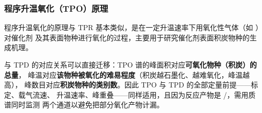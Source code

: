 \subsubsection{程序升温氧化（TPO）原理}

程序升温氧化的原理与 TPR 基本类似，是在一定升温速率下用氧化性气体（如 ）对催化剂
及其表面物种进行氧化的过程，主要用于研究催化剂表面积炭物种的生成机理。

\begin{principle}
与 TPD 的对应关系可以直接迁移：TPO 谱的峰面积对应\textbf{可氧化物种（积炭）的总量}，
峰温对应\textbf{该物种被氧化的难易程度}（积炭越石墨化、越难氧化，峰温越高），
峰数目对应\textbf{积炭物种的类别数}。因此 TPO 与 TPD 的全部定量前提——标定、载气流速、
升温速率、峰重叠——同样适用，且因为反应产物是 /，需用质谱同时监测
两个通道以避免把部分氧化产物计漏。
\end{principle}

